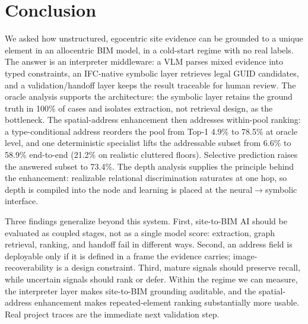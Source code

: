 \section{Conclusion}
\label{sec:conclusion}

We asked how unstructured, egocentric site evidence can be grounded to a unique element in an
allocentric BIM model, in a cold-start regime with no real labels. The answer is an interpreter
middleware: a VLM parses mixed evidence into typed constraints, an IFC-native symbolic layer retrieves
legal GUID candidates, and a validation/handoff layer keeps the result traceable for human review.
The oracle analysis supports the architecture: the symbolic layer retains the ground truth in 100\%
of cases and isolates extraction, not retrieval design, as the bottleneck. The spatial-address
enhancement then addresses within-pool ranking: a type-conditional address reorders the pool from
Top-1 4.9\% to 78.5\% at oracle level, and one deterministic specialist lifts the addressable subset
from 6.6\% to 58.9\% end-to-end (21.2\% on realistic cluttered floors). Selective prediction raises
the answered subset to 73.4\%. The depth
analysis supplies the principle behind the enhancement: realizable relational discrimination
saturates at one hop, so depth is compiled into the node and learning is placed at the
neural$\to$symbolic interface.

Three findings generalize beyond this system. First, site-to-BIM AI should be evaluated as coupled
stages, not as a single model score: extraction, graph retrieval, ranking, and handoff fail in
different ways. Second, an address field is deployable only if it is defined in a frame the evidence
carries; image-recoverability is a design constraint. Third, mature signals should preserve recall,
while uncertain signals should rank or defer. Within the regime we can measure, the interpreter layer
makes site-to-BIM grounding auditable, and the spatial-address enhancement makes repeated-element
ranking substantially more usable. Real project traces are the immediate next validation step.
